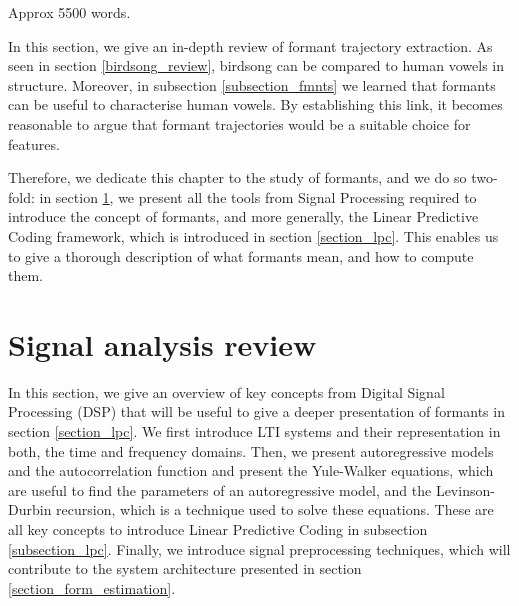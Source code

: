 \documentclass[../main.tex]{subfiles}
\begin{document}
 \label{chapter_formants}
Approx 5500 words.
\par In this section, we give an in-depth review of formant trajectory extraction. As seen in section \ref{birdsong_review}, birdsong can be compared to human vowels in structure. Moreover, in subsection \ref{subsection_fmnts} we learned that formants can be useful to characterise human vowels. By establishing this link, it becomes reasonable to argue that formant trajectories would be a suitable choice for features. 
\par Therefore, we dedicate this chapter to the study of formants, and we do so two-fold: in section \ref{section_dsp}, we present all the tools from Signal Processing required to introduce the concept of formants, and more generally, the Linear Predictive Coding framework, which is introduced in section \ref{section_lpc}. This enables us to give a thorough description of what formants mean, and how to compute them.

\section{Signal analysis review} \label{section_dsp}
In this section, we give an overview of key concepts from Digital Signal Processing (DSP) that will be useful to give a deeper presentation of formants in section \ref{section_lpc}. We first introduce LTI systems and their representation in both, the time and frequency domains. Then, we present autoregressive models and the autocorrelation function and present the Yule-Walker equations, which are useful to find the parameters of an autoregressive model, and the Levinson-Durbin recursion, which is a technique used to solve these equations. These are all key concepts to introduce Linear Predictive Coding in subsection \ref{subsection_lpc}. Finally, we introduce signal preprocessing techniques, which will contribute to the system architecture presented in section \ref{section_form_estimation}.
\end{document}
